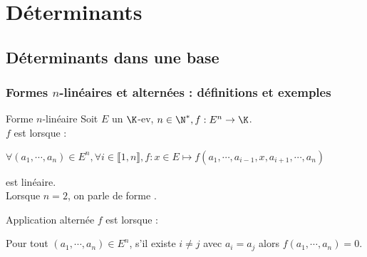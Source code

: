 \documentclass[12pt,a4paper]{report}
\begin{document}
\chapter{Déterminants}

\section{Déterminants dans une base}

\subsection{Formes $n$-linéaires et alternées : définitions et exemples}

\begin{definition}{Forme $n$-linéaire}{}
Soit $E$ un $\K$-ev, $n \in \N^*, f : E^n \to \K$. \\
$f$ est  lorsque :
\begin{center}
$\forall (a_1,\cdots,a_n) \in E^n, \forall i \in \llbracket 1,n \rrbracket, f : x \in E \mapsto f(a_1,\cdots,a_{i-1},x,a_{i+1},\cdots,a_n)$
\end{center}
est linéaire. \\

Lorsque $n=2$, on parle de forme .
\end{definition}

\begin{definition}{Application alternée}{}
$f$ est  lorsque :
\begin{center}
Pour tout $(a_1,\cdots,a_n) \in E^n$, s'il existe $i \ne j$ avec $a_i = a_j$ alors $f(a_1,\cdots,a_n) = 0$.
\end{center}
\end{definition}
\end{document}
